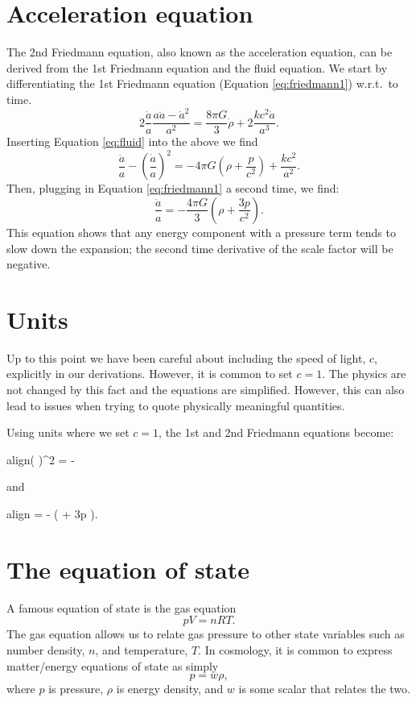 \documentclass[a4paper,12pt]{article}
\newcommand{\boxedeq}[2]{\begin{empheq}[box={\fboxsep=6pt\fbox}]{align}\label{#1}#2\end{empheq}}
\theoremstyle{remark}
\renewcommand{\=}[1]{\stackrel{#1}{=}} %
\theoremstyle{plain}
\theoremstyle{definition}
\begin{document}
\section{Acceleration equation}
The 2nd Friedmann equation, also known as the acceleration equation, can be derived from the 1st Friedmann equation and the fluid equation. We start by differentiating the 1st Friedmann equation (Equation \ref{eq:friedmann1}) w.r.t.\ to time. 
\begin{equation}
2\frac{\dot{a}}{a} \frac{a\ddot{a}-\dot{a}^{2}}{a^{2}} = \frac{8\pi G}{3}\dot{\rho} + 2\frac{kc^{2}\dot{a}}{a^{3}}.
\end{equation}
Inserting Equation \ref{eq:fluid} into the above we find
\begin{equation}
\frac{\ddot{a}}{a} - \left( \frac{\dot{a}}{a} \right)^{2} = -4\pi G \left( \rho + \frac{p}{c^{2}} \right) + \frac{kc^{2}}{a^{2}}.
\end{equation}
Then, plugging in Equation \ref{eq:friedmann1} a second time, we find:
\begin{equation}
\frac{\ddot{a}}{a} = -\frac{4\pi G}{3} \left( \rho + \frac{3p}{c^{2}} \right).
\end{equation}
This equation shows that any energy component with a pressure term tends to slow down the expansion; the second time derivative of the scale factor will be negative.

\section{Units}
Up to this point we have been careful about including the speed of light, $c$, explicitly in our derivations. However, it is common to set $c=1$. The physics are not changed by this fact and the equations are simplified. However, this can also lead to issues when trying to quote physically meaningful quantities.

Using units where we set $c = 1$, the 1st and 2nd Friedmann equations become:
%
\boxedeq{eq:friedmann1b}{\left(  \right)^{2} = \frac{8\pi G}{3} \rho - \frac{k}{a^{2}}}
and
\boxedeq{eq:friedmann2b}{ = - \left( \rho + 3p \right).}

\section{The equation of state}
A famous equation of state is the gas equation
\begin{equation}
pV = nRT.
\end{equation}
The gas equation allows us to relate gas pressure to other state variables such as number density, $n$, and temperature, $T$. In cosmology, it is common to express matter/energy equations of state as simply
\begin{equation}
p = w\rho,
\end{equation}
where $p$ is pressure, $\rho$ is energy density, and $w$ is some scalar that relates the two.
\end{document}
